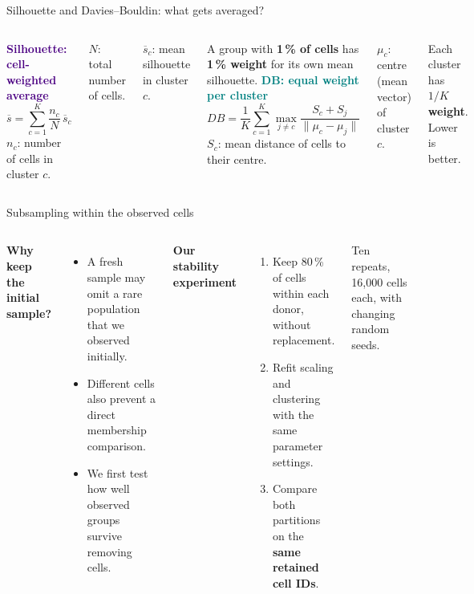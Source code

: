 \documentclass[aspectratio=169,10pt]{beamer}
\begin{document}
\begin{frame}{Silhouette and Davies--Bouldin: what gets averaged?}
  \begin{columns}[T,onlytextwidth]
    \textcolor{Indigo}{\textbf{Silhouette: cell-weighted average}}
    \[\overline{s}=\sum_{c=1}^{K}\frac{n_c}{N}\,\overline{s}_c\]
    \small
    $n_c$: number of cells in cluster $c$.\par
    $N$: total number of cells.\par
    $\overline{s}_c$: mean silhouette in cluster $c$.\par
    \vspace{3mm}
    A group with \textbf{1\,\% of cells} has \textbf{1\,\% weight} for its own mean silhouette.
    \textcolor{Teal}{\textbf{DB: equal weight per cluster}}
    \[DB=\frac{1}{K}\sum_{c=1}^{K}\max_{j\ne c}
        \frac{S_c+S_j}{\lVert\mu_c-\mu_j\rVert}\]
    \small
    $S_c$: mean distance of cells to their centre.\par
    $\mu_c$: centre (mean vector) of cluster $c$.\par
    \vspace{7mm}
    Each cluster has \textbf{$1/K$ weight}. Lower is better.
  \end{columns}
\end{frame}

\begin{frame}{Subsampling within the observed cells}
  \begin{columns}[T,onlytextwidth]
    \textbf{Why keep the initial sample?}
    \begin{itemize}
      \item A fresh sample may omit a rare population that we observed initially.
      \item Different cells also prevent a direct membership comparison.
      \item We first test how well observed groups survive removing cells.
    \end{itemize}
    \textbf{Our stability experiment}
    \begin{enumerate}
      \item Keep 80\,\% of cells within each donor, without replacement.
      \item Refit scaling and clustering with the same parameter settings.
      \item Compare both partitions on the \textbf{same retained cell IDs}.
    \end{enumerate}
    \small Ten repeats, 16,000 cells each, with changing random seeds.
  \end{columns}
\end{frame}
\end{document}
